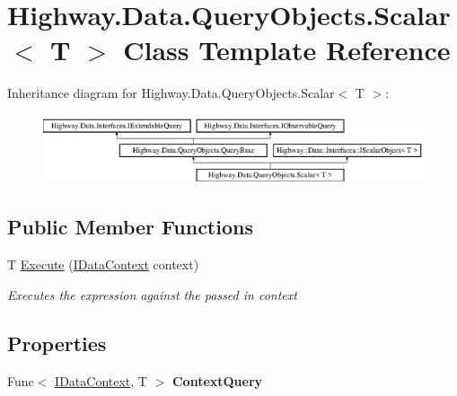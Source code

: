 \hypertarget{class_highway_1_1_data_1_1_query_objects_1_1_scalar-g}{\section{Highway.\-Data.\-Query\-Objects.\-Scalar$<$ T $>$ Class Template Reference}
\label{class_highway_1_1_data_1_1_query_objects_1_1_scalar-g}
}
Inheritance diagram for Highway.\-Data.\-Query\-Objects.\-Scalar$<$ T $>$\-:\begin{figure}[H]
\begin{center}
\leavevmode
\includegraphics[height=2.021661cm]{class_highway_1_1_data_1_1_query_objects_1_1_scalar-g}
\end{center}
\end{figure}
\subsection*{Public Member Functions}
\begin{DoxyCompactItemize}
\item 
T \hyperlink{class_highway_1_1_data_1_1_query_objects_1_1_scalar-g_aff12d516dd21701d1f48c9fb370c5683}{Execute} (\hyperlink{interface_highway_1_1_data_1_1_interfaces_1_1_i_data_context}{I\-Data\-Context} context)
\begin{DoxyCompactList}\small\item\em Executes the expression against the passed in context \end{DoxyCompactList}\end{DoxyCompactItemize}
\subsection*{Properties}
\begin{DoxyCompactItemize}
\item 
\hypertarget{class_highway_1_1_data_1_1_query_objects_1_1_scalar-g_acb183b773f6c4bb8c9a989c1144095db}{Func$<$ \hyperlink{interface_highway_1_1_data_1_1_interfaces_1_1_i_data_context}{I\-Data\-Context}, T $>$ {\bfseries Context\-Query}}\label{class_highway_1_1_data_1_1_query_objects_1_1_scalar-g_acb183b773f6c4bb8c9a989c1144095db}

\end{DoxyCompactItemize}
